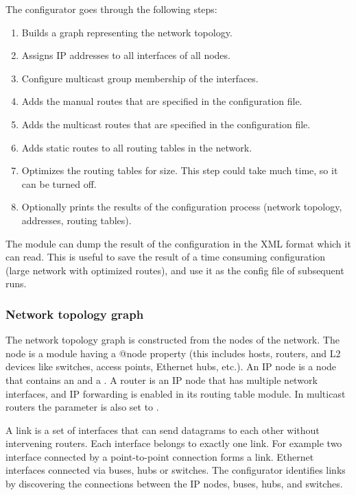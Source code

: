 The configurator goes through the following steps:
\begin{enumerate}
  \item Builds a graph representing the network topology.
  \item Assigns IP addresses to all interfaces of all nodes.
  \item Configure multicast group membership of the interfaces.
  \item Adds the manual routes that are specified in the configuration file.
  \item Adds the multicast routes that are specified in the configuration file.
  \item Adds static routes to all routing tables in the network.
  \item Optimizes the routing tables for size. This step could take
        much time, so it can be turned off.
  \item Optionally prints the results of the configuration process
        (network topology, addresses, routing tables).
\end{enumerate}

The module can dump the result of the configuration in the XML format
which it can read. This is useful to save the result of a time consuming
configuration (large network with optimized routes), and use it as
the config file of subsequent runs.

\subsubsection*{Network topology graph}

The network topology graph is constructed from the nodes
of the network. The node is a module having a @node property
(this includes hosts, routers, and L2 devices like switches,
 access points, Ethernet hubs, etc.). An IP node is a node
that contains an  and a .
A router is an IP node that has multiple network interfaces,
and IP forwarding is enabled in its routing table module.
In multicast routers the  parameter
is also set to .

A link is a set of interfaces that can send datagrams to each other
without intervening routers. Each interface belongs to exactly
one link. For example two interface connected
by a point-to-point connection forms a link. Ethernet interfaces
connected via buses, hubs or switches.
The configurator identifies links by discovering
the connections between the IP nodes, buses, hubs, and switches.

